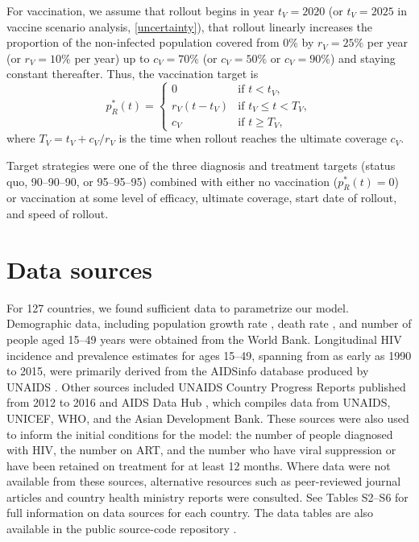\documentclass{article}
\begin{document}
For vaccination, we assume that rollout begins in year $t_V = 2020$
(or $t_V = 2025$ in vaccine scenario analysis, \autoref{uncertainty}),
that rollout linearly increases the proportion of the non-infected
population covered from 0\% by $r_V = 25\%$ per year (or $r_V = 10\%$
per year) up to $c_V = 70\%$ (or $c_V = 50\%$ or $c_V = 90\%$) and
staying constant thereafter.  Thus, the vaccination target is
\begin{equation}
  \label{vaccination_target}
  p_R^*(t) =
  \begin{cases}
    0 & \text{if $t < t_V$},
    \\
    r_V (t - t_V) & \text{if $t_V \leq t < T_V$},
    \\
    c_V & \text{if $t \geq T_V$},
  \end{cases}
\end{equation}
where $T_V = t_V + c_V / r_V$ is the time when rollout reaches
the ultimate coverage $c_V$.

Target strategies were one of the three diagnosis and treatment
targets (status quo, 90--90--90, or 95--95--95) combined with either
no vaccination ($p_R^*(t) = 0$) or vaccination at some level of
efficacy, ultimate coverage, start date of rollout, and speed of
rollout.


\section{Data sources}
\label{data_sources}

For 127 countries, we found sufficient data to parametrize our model.
Demographic data, including population growth rate \cite{WorldBankpg},
death rate \cite{World_Development_Indicators2013-ee}, and number of
people aged 15--49 years \cite{The_World_Bank2016-fd} were obtained
from the World Bank. Longitudinal HIV incidence and prevalence
estimates for ages 15--49, spanning from as early as 1990 to 2015,
were primarily derived from the AIDSinfo database produced by UNAIDS
\cite{Unaids2016-an}. Other sources included UNAIDS Country Progress
Reports \cite{Unaids2016-am} published from 2012 to 2016 and AIDS Data
Hub \cite{AIDSdatahub-fg}, which compiles data from UNAIDS, UNICEF,
WHO, and the Asian Development Bank. These sources were also used to
inform the initial conditions for the model: the number of people
diagnosed with HIV, the number on ART, and the number who have viral
suppression or have been retained on treatment for at least 12
months. Where data were not available from these sources, alternative
resources such as peer-reviewed journal articles and country health
ministry reports were consulted.  See Tables S2--S6 for full
information on data sources for each country.  The data tables are
also available in the public source-code repository
\cite{medlock2016-git}.
\end{document}
